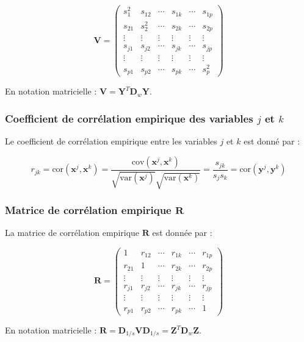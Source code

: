 \documentclass[10pt,a4paper]{article}
\begin{document}
\[
\mathbf{V} = \begin{pmatrix}
s_1^2 & s_{12} & \cdots & s_{1k} & \cdots & s_{1p} \\
s_{21} & s_2^2 & \cdots & s_{2k} & \cdots & s_{2p} \\
\vdots & \vdots & \vdots & \vdots & \vdots & \vdots \\
s_{j1} & s_{j2} & \cdots & s_{jk} & \cdots & s_{jp} \\
\vdots & \vdots & \vdots & \vdots & \vdots & \vdots \\
s_{p1} & s_{p2} & \cdots & s_{pk} & \cdots & s_p^2
\end{pmatrix}
\]

En notation matricielle : $\mathbf{V} = \mathbf{Y}^T \mathbf{D}_w \mathbf{Y}$.

\subsubsection*{Coefficient de corrélation empirique des variables $j$ et $k$}
Le coefficient de corrélation empirique entre les variables $j$ et $k$ est donné par :

\[
r_{jk} = \text{cor}(\mathbf{x}^j, \mathbf{x}^k) = \frac{\text{cov}(\mathbf{x}^j, \mathbf{x}^k)}{\sqrt{\text{var}(\mathbf{x}^j)} \sqrt{\text{var}(\mathbf{x}^k)}} = \frac{s_{jk}}{s_j s_k} = \text{cor}(\mathbf{y}^j, \mathbf{y}^k)
\]

\subsubsection*{Matrice de corrélation empirique $\mathbf{R}$}
La matrice de corrélation empirique $\mathbf{R}$ est donnée par :

\[
\mathbf{R} = \begin{pmatrix}
1 & r_{12} & \cdots & r_{1k} & \cdots & r_{1p} \\
r_{21} & 1 & \cdots & r_{2k} & \cdots & r_{2p} \\
\vdots & \vdots & \vdots & \vdots & \vdots & \vdots \\
r_{j1} & r_{j2} & \cdots & r_{jk} & \cdots & r_{jp} \\
\vdots & \vdots & \vdots & \vdots & \vdots & \vdots \\
r_{p1} & r_{p2} & \cdots & r_{pk} & \cdots & 1
\end{pmatrix}
\]

En notation matricielle : $\mathbf{R} = \mathbf{D}_{1/s} \mathbf{V} \mathbf{D}_{1/s} = \mathbf{Z}^T \mathbf{D}_w \mathbf{Z}$.
\end{document}
